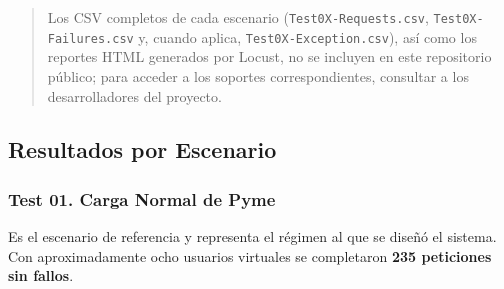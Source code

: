\begin{quote}
Los CSV completos de cada escenario (\texttt{Test0X-Requests.csv}, \texttt{Test0X-Failures.csv} y, cuando aplica, \texttt{Test0X-Exception.csv}), así como los reportes HTML generados por Locust, no se incluyen en este repositorio público; para acceder a los soportes correspondientes, consultar a los desarrolladores del proyecto.
\end{quote}

\subsection{Resultados por Escenario}\label{resultados-por-escenario}

\subsubsection{Test 01. Carga Normal de Pyme}\label{test-01.-carga-normal-de-pyme}

Es el escenario de referencia y representa el régimen al que se diseñó el sistema. Con aproximadamente ocho usuarios virtuales se completaron \textbf{235 peticiones sin fallos}.

